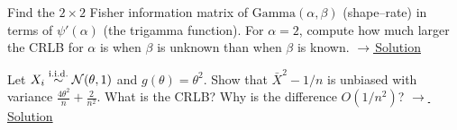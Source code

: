 \documentclass[main.tex]{subfiles}
\begin{document}
\begin{exercise}\label{exr:08-3}
Find the $2\times2$ Fisher information matrix of $\text{Gamma}(\alpha,\beta)$ (shape--rate) in terms of $\psi'(\alpha)$ (the trigamma function). For $\alpha=2$, compute how much larger the CRLB for $\alpha$ is when $\beta$ is unknown than when $\beta$ is known.
\hfill\hyperref[coz:08-3]{\footnotesize$\rightarrow$\,Solution}
\end{exercise}

\begin{exercise}\label{exr:08-4}
Let $X_i\overset{\text{i.i.d.}}{\sim}\mathcal{N}(\theta,1)$ and $g(\theta)=\theta^2$. Show that $\bar X^2-1/n$ is unbiased with variance $\frac{4\theta^2}{n}+\frac{2}{n^2}$. What is the CRLB? Why is the difference $O(1/n^2)$?
\hfill\hyperref[coz:08-4]{\footnotesize$\rightarrow$\,Solution}
\end{exercise}

\end{document}
